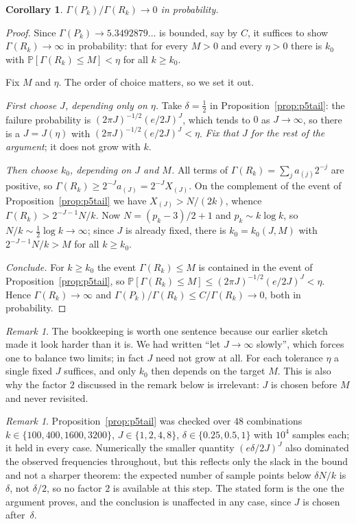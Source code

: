 \documentclass[11pt,a4paper]{article}
\theoremstyle{plain}
\newtheorem{corollary}[theorem]{Corollary}
\theoremstyle{definition}
\theoremstyle{remark}
\newtheorem{remark}[theorem]{Remark}
\begin{document}
\begin{corollary}\label{cor:p5prob}
$\Gamma(P_k)/\Gamma(R_k)\to0$ in probability.
\end{corollary}

\begin{proof}
Since $\Gamma(P_k)\to5.3492879\ldots$ is bounded, say by $C$, it suffices to show
$\Gamma(R_k)\to\infty$ in probability: that for every $M>0$ and every $\eta>0$
there is $k_0$ with $\mathbb{P}[\Gamma(R_k)\le M]<\eta$ for all $k\ge k_0$.

Fix $M$ and $\eta$. The order of choice matters, so we set it out.

\emph{First choose $J$, depending only on $\eta$.} Take $\delta=\tfrac12$ in
Proposition~\ref{prop:p5tail}: the failure probability is
$(2\pi J)^{-1/2}(e/2J)^{J}$, which tends to $0$ as $J\to\infty$, so there is a
$J=J(\eta)$ with $(2\pi J)^{-1/2}(e/2J)^{J}<\eta$. \emph{Fix that $J$ for the
rest of the argument}; it does not grow with $k$.

\emph{Then choose $k_0$, depending on $J$ and $M$.} All terms of
$\Gamma(R_k)=\sum_{j}a_{(j)}2^{-j}$ are positive, so
$\Gamma(R_k)\ge2^{-J}a_{(J)}=2^{-J}X_{(J)}$. On the complement of the event of
Proposition~\ref{prop:p5tail} we have $X_{(J)}>N/(2k)$, whence
$\Gamma(R_k)>2^{-J-1}N/k$. Now $N=(p_k-3)/2+1$ and $p_k\sim k\log k$, so
$N/k\sim\tfrac12\log k\to\infty$; since $J$ is already fixed, there is
$k_0=k_0(J,M)$ with $2^{-J-1}N/k>M$ for all $k\ge k_0$.

\emph{Conclude.} For $k\ge k_0$ the event $\Gamma(R_k)\le M$ is contained in the
event of Proposition~\ref{prop:p5tail}, so
$\mathbb{P}[\Gamma(R_k)\le M]\le(2\pi J)^{-1/2}(e/2J)^{J}<\eta$. Hence
$\Gamma(R_k)\to\infty$ and $\Gamma(P_k)/\Gamma(R_k)\le C/\Gamma(R_k)\to0$, both
in probability.
\end{proof}

\begin{remark}
The bookkeeping is worth one sentence because our earlier sketch made it look
harder than it is. We had written ``let $J\to\infty$ slowly'', which forces one
to balance two limits; in fact $J$ need not grow at all. For each tolerance
$\eta$ a single fixed $J$ suffices, and only $k_0$ then depends on the target
$M$. This is also why the factor $2$ discussed in the remark below is
irrelevant: $J$ is chosen before $M$ and never revisited.
\end{remark}

\begin{remark}
Proposition~\ref{prop:p5tail} was checked over $48$ combinations
$k\in\{100,400,1600,3200\}$, $J\in\{1,2,4,8\}$, $\delta\in\{0.25,0.5,1\}$ with
$10^{4}$ samples each; it held in every case. Numerically the smaller quantity
$(e\delta/2J)^{J}$ also dominated the observed frequencies throughout, but this
reflects only the slack in the bound and not a sharper theorem: the expected
number of sample points below $\delta N/k$ is $\delta$, not $\delta/2$, so no
factor $2$ is available at this step. The stated form is the one the argument
proves, and the conclusion is unaffected in any case, since $J$ is chosen
after~$\delta$.
\end{remark}
\end{document}
